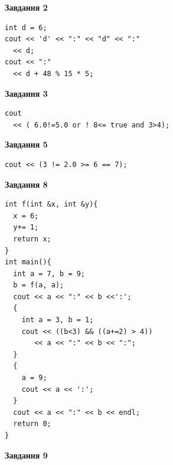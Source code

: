 \documentclass[12pt, ukrainian]{article}
\begin{document}
{\begin {large}
\begin{minipage}[t]{7.0cm}
\end{minipage}
\vline \hspace{1mm}
\begin{minipage}[t]{11.0cm}

\begin{center}
\textbf{Завдання 2}
\end{center}
\vspace{-8mm}

\begin{verbatim}
int d = 6;
cout << 'd' << ":" << "d" << ":" 
  << d;
cout << ":" 
  << d + 48 % 15 * 5;
\end{verbatim}



\begin{center}
\textbf{Завдання 3}
\end{center}
\vspace{-8mm}

\begin{verbatim}
cout 
  << ( 6.0!=5.0 or ! 8<= true and 3>4);
\end{verbatim}



\begin{center}
\textbf{Завдання 5}
\end{center}
\vspace{-8mm}

\begin{verbatim}
cout << (3 != 2.0 >= 6 == 7);
\end{verbatim}



\begin{center}
\textbf{Завдання 8}
\end{center}
\vspace{-8mm}

\begin{verbatim}
int f(int &x, int &y){
  x = 6;
  y+= 1;
  return x;
}
int main(){
  int a = 7, b = 9;
  b = f(a, a);
  cout << a << ":" << b <<':';
  {
    int a = 3, b = 1;
    cout << ((b<3) && ((a+=2) > 4))
       << a << ":" << b << ":";
  }
  {
    a = 9;
    cout << a << ':';
  }
  cout << a << ":" << b << endl;
  return 0;
}
\end{verbatim}

\end{minipage}


\begin{minipage}[t]{7.0cm}

\begin{center}
\textbf{Завдання 9}
\end{center}
\vspace{-8mm}


\end{minipage}
\end{large}}
\end{document}
